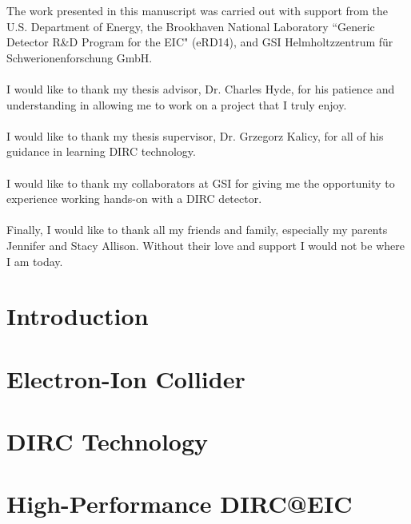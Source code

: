 \documentclass[12pt]{report}
\numberwithin{equation}{chapter}
\begin{document}
The work presented in this manuscript was carried out with support from the U.S. Department of Energy, the Brookhaven National Laboratory ``Generic Detector R\&D Program for the EIC" (eRD14), and GSI Helmholtzzentrum f\"ur Schwerionenforschung GmbH.
\\~\\
I would like to thank my thesis advisor, Dr. Charles Hyde, for his patience  and understanding in allowing me to work on a project that I truly enjoy.
\\~\\
I would like to thank my thesis supervisor, Dr. Grzegorz Kalicy, for all of his guidance in learning DIRC technology. 
\\~\\
I would like to thank my collaborators at GSI for giving me the opportunity to experience working hands-on with a DIRC detector.
\\~\\
Finally, I would like to thank all my friends and family, especially my parents Jennifer and Stacy Allison. Without their love and support I would not be where I am today.

\afterpreface



\chapter{Introduction}

\chapter{Electron-Ion Collider}

\chapter{DIRC Technology}

\chapter{High-Performance DIRC@EIC}
\end{document}
